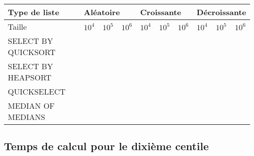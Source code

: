 \documentclass[a4paper, 10pt, oneside]{article}
\begin{document}
\begin{table}[!h]
\begin{tabular}{|l|lllllllll|}
\hline
Type de liste       & \multicolumn{3}{l}{Aléatoire}                                                              & \multicolumn{3}{l}{Croissante}                                        & \multicolumn{3}{l|}{Décroissante}                                     \\ \hline
Taille              & \multicolumn{1}{l|}{$10^4$} & $10^5$ & $10^6$ & $10^4$ & $10^5$ & $10^6$ & $10^4$ & $10^5$ & $10^6$ \\ \hline
SELECT BY QUICKSORT & \multicolumn{1}{l|}{}                      & \multicolumn{1}{l|}{} & \multicolumn{1}{l|}{} & \multicolumn{1}{l|}{} & \multicolumn{1}{l|}{} & \multicolumn{1}{l|}{} & \multicolumn{1}{l|}{} & \multicolumn{1}{l|}{} &                       \\
SELECT BY HEAPSORT  & \multicolumn{1}{l|}{}                      & \multicolumn{1}{l|}{} & \multicolumn{1}{l|}{} & \multicolumn{1}{l|}{} & \multicolumn{1}{l|}{} & \multicolumn{1}{l|}{} & \multicolumn{1}{l|}{} & \multicolumn{1}{l|}{} &                       \\
QUICKSELECT         & \multicolumn{1}{l|}{}                      & \multicolumn{1}{l|}{} & \multicolumn{1}{l|}{} & \multicolumn{1}{l|}{} & \multicolumn{1}{l|}{} & \multicolumn{1}{l|}{} & \multicolumn{1}{l|}{} & \multicolumn{1}{l|}{} &                       \\
MEDIAN OF MEDIANS   & \multicolumn{1}{l|}{}                      & \multicolumn{1}{l|}{} & \multicolumn{1}{l|}{} & \multicolumn{1}{l|}{} & \multicolumn{1}{l|}{} & \multicolumn{1}{l|}{} & \multicolumn{1}{l|}{} & \multicolumn{1}{l|}{} &                       \\ \hline
\end{tabular}
\end{table}


\subsection{Temps de calcul pour le dixième centile}
\end{document}

